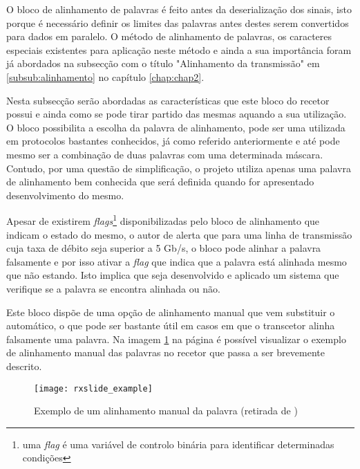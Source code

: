 O bloco de alinhamento de palavras é feito antes da deserialização dos sinais, isto porque é necessário definir os limites das palavras antes destes serem convertidos para dados em paralelo. O método de alinhamento de palavras, os caracteres especiais existentes para aplicação neste método e ainda a sua importância foram já abordados na subsecção com o título "Alinhamento da transmissão" em \ref{subsub:alinhamento} no capítulo \ref{chap:chap2}.

Nesta subsecção serão abordadas as características que este bloco do recetor possui e ainda como se pode tirar partido das mesmas aquando a sua utilização. O bloco possibilita a escolha da palavra de alinhamento, pode ser uma utilizada em protocolos bastantes conhecidos, já como referido anteriormente e até pode mesmo ser a combinação de duas palavras com uma determinada máscara. Contudo, por uma questão de simplificação, o projeto utiliza apenas uma palavra de alinhamento bem conhecida que será definida quando for apresentado desenvolvimento do mesmo.

Apesar de existirem \textit{flags}\footnote{uma \textit{flag} é uma variável de controlo binária para identificar determinadas condições} disponibilizadas pelo bloco de alinhamento que indicam o estado do mesmo, o autor de \cite{R011} alerta que para uma linha de transmissão cuja taxa de débito seja superior a 5 Gb/s, o bloco pode alinhar a palavra falsamente e por isso ativar a \textit{flag} que indica que a palavra está alinhada mesmo que não estando. Isto implica que seja desenvolvido e aplicado um sistema que verifique se a palavra se encontra alinhada ou não.


Este bloco dispõe de uma opção de alinhamento manual que vem substituir o automático, o que pode ser bastante útil em casos em que o transcetor alinha falsamente uma palavra. Na imagem \ref{fig:rxslide_example} na página \pageref{fig:rxslide_example} é possível visualizar o exemplo de alinhamento manual das palavras no recetor que passa a ser brevemente descrito.

\begin{figure}[h!]
	\begin{center}
		\leavevmode
		\texttt{[image: rxslide\_example]}
		\captionsetup{width=1.0\linewidth}
		\caption[Exemplo de um alinhamento manual da palavra]{Exemplo de um alinhamento manual da palavra (retirada de \cite{R011})}
		\label{fig:rxslide_example}
	\end{center}
\end{figure}

